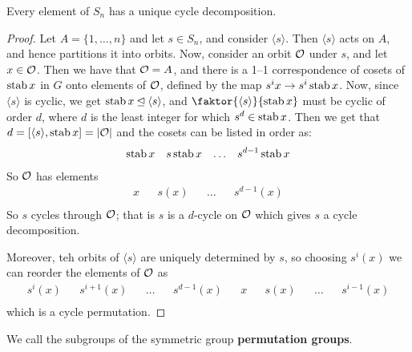 \begin{theorem}\label{theorem_4.1.5}
  Every element of $S_n$ has a unique cycle decomposition.
\end{theorem}
\begin{proof}
  Let $A=\{1, \dots, n\}$ and let $s \in S_n$, and consider  $\langle s \rangle$.
  Then $\langle s \rangle$ acts on $A$, and hence partitions it into orbits. Now,
  consider an orbit  $\mathcal{O}$ under  $s$, and let  $x \in \mathcal{O}$. Then we have that
  $\mathcal{O}=A$, and there is a 1--1 correspondence of cosets of $\operatorname{stab}{x}$ in $G$
  onto elements of  $\mathcal{O}$, defined by the map  $s^ix \rightarrow
  s^i\operatorname{stab}{x}$. Now, since $\langle s \rangle$ is cyclic, we get $\operatorname{stab}{x}
  \unlhd \langle s \rangle$, and $\faktor{\langle s \rangle}{\stab{x}}$ must
  be cyclic of order $d$, where  $d$ is the least integer for which  $s^d \in \operatorname{stab}{x}$. Then we
  get that $d=[\langle s \rangle,\operatorname{stab}{x}]=|\mathcal{O}|$ and the cosets can be listed in
  order as:
  \begin{align*}
    \operatorname{stab}{x}   &&   s\operatorname{stab}{x}   &&   \dots   &&   s^{d-1}\operatorname{stab}{x} \\
  \end{align*}
  So $\mathcal{O}$ has elements
  \begin{align*}
    x      &&      s(x)    &&      \dots       &&      s^{d-1}(x)      \\
  \end{align*}
  So $s$ cycles through  $\mathcal{O}$; that is  $s$ is a  $d$-cycle on $\mathcal{O}$ which
  gives  $s$ a cycle decomposition.

  Moreover, teh orbits of  $\langle s \rangle$ are uniquely determined by $s$, so
  choosing  $s^i(x)$ we can reorder the elements of $\mathcal{O}$ as
  \begin{align*}
    s^i(x) && s^{i+1}(x) && \dots && s^{d-1}(x) && x && s(x) && \dots &&
    s^{i-1}(x) \\
  \end{align*}
  which is a cycle permutation.
\end{proof}

\begin{definition}
  We call the subgroups of the symmetric group \textbf{permutation groups}.
\end{definition}
